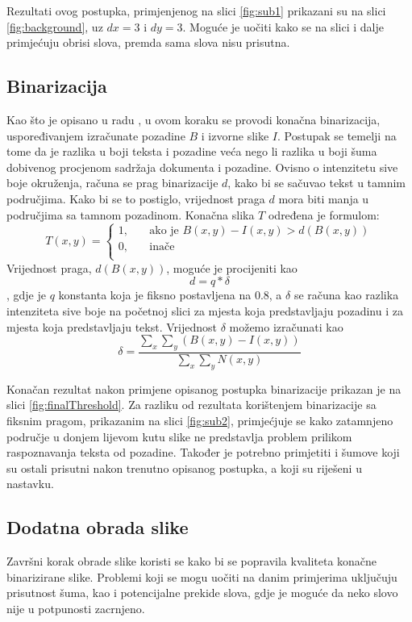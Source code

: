 \documentclass[times, utf8, zavrsni, numeric]{fer}
\begin{document}
Rezultati ovog postupka, primjenjenog na slici \ref{fig:sub1} prikazani su na slici \ref{fig:background}, uz $dx=3$ i $dy=3$.
Moguće je uočiti kako se na slici i dalje primjećuju obrisi slova, premda sama slova nisu prisutna.

\subsection{Binarizacija}
Kao što je opisano u radu \cite{AdaptiveBinarization}, u ovom koraku se provodi konačna binarizacija, uspoređivanjem izračunate pozadine $B$ i izvorne slike $I$.
Postupak se temelji na tome da je razlika u boji teksta i pozadine veća nego li razlika u boji šuma dobivenog procjenom sadržaja dokumenta i pozadine.
Ovisno o intenzitetu sive boje okruženja, računa se prag binarizacije $d$, kako bi se sačuvao tekst u tamnim područjima.
Kako bi se to postiglo, vrijednost praga $d$ mora biti manja u područjima sa tamnom pozadinom.
Konačna slika $T$ određena je formulom:
\[
    T(x, y) = 
    \begin{cases}
    1,  & \quad \text{ako je } B(x, y) - I(x, y) > d(B(x, y)) \\
    0,  & \quad \text{inače}\\
    \end{cases}
\]
Vrijednost praga, $d(B(x, y))$, moguće je procijeniti kao 
\[d = q * \delta\]
, gdje je $q$ konstanta koja je fiksno postavljena na $0.8$, a $\delta$ se računa kao razlika intenziteta sive boje na početnoj slici za mjesta koja predstavljaju pozadinu i za mjesta koja predstavljaju tekst.
Vrijednost $\delta$ možemo izračunati kao
\[
    \delta = \frac{
        \displaystyle \sum_x
        \displaystyle \sum_y
        (B(x, y) - I(x, y))
    }{
        \displaystyle \sum_x
        \displaystyle \sum_y
        N(x, y)
    }
\]

Konačan rezultat nakon primjene opisanog postupka binarizacije prikazan je na slici \ref{fig:finalThreshold}.
Za razliku od rezultata korištenjem binarizacije sa fiksnim pragom, prikazanim na slici \ref{fig:sub2}, primjećjuje se kako zatamnjeno područje u donjem lijevom kutu slike ne predstavlja problem prilikom raspoznavanja teksta od pozadine.
Također je potrebno primjetiti i šumove koji su ostali prisutni nakon trenutno opisanog postupka, a koji su riješeni u nastavku.

\subsection{Dodatna obrada slike}
Završni korak obrade slike koristi se kako bi se popravila kvaliteta konačne binarizirane slike.
Problemi koji se mogu uočiti na danim primjerima uključuju prisutnost šuma, kao i potencijalne prekide slova, gdje je moguće da neko slovo nije u potpunosti zacrnjeno.\\
\end{document}
